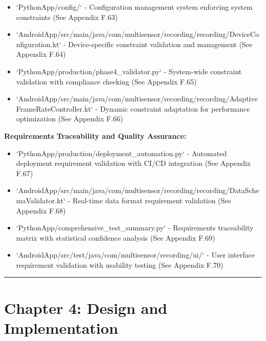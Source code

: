 \documentclass[12pt,a4paper]{report}
\begin{document}
\begin{itemize}
\item `PythonApp/config/` - Configuration management system enforcing system constraints (See Appendix F.63)
\item `AndroidApp/src/main/java/com/multisensor/recording/recording/DeviceConfiguration.kt` - Device-specific constraint
  validation and management (See Appendix F.64)
\item `PythonApp/production/phase4_validator.py` - System-wide constraint validation with compliance checking (See
  Appendix F.65)
\item `AndroidApp/src/main/java/com/multisensor/recording/recording/AdaptiveFrameRateController.kt` - Dynamic constraint
  adaptation for performance optimization (See Appendix F.66)

\end{itemize}
\textbf{Requirements Traceability and Quality Assurance:}

\begin{itemize}
\item `PythonApp/production/deployment_automation.py` - Automated deployment requirement validation with CI/CD
  integration (See Appendix F.67)
\item `AndroidApp/src/main/java/com/multisensor/recording/recording/DataSchemaValidator.kt` - Real-time data format
  requirement validation (See Appendix F.68)
\item `PythonApp/comprehensive_test_summary.py` - Requirements traceability matrix with statistical confidence analysis (See
  Appendix F.69)
\item `AndroidApp/src/test/java/com/multisensor/recording/ui/` - User interface requirement validation with usability
  testing (See Appendix F.70)

\end{itemize}
\hrule

\section{Chapter 4: Design and Implementation}
\end{document}

